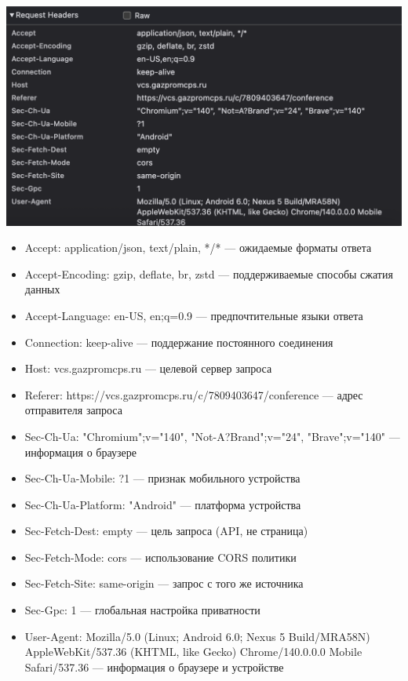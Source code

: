\documentclass{article}
\begin{document}
\begin{center}
  \includegraphics[width=.9\textwidth]{11}
\end{center}

\begin{itemize}
  \item Accept: application/json, text/plain, */* --- ожидаемые форматы ответа
  \item Accept-Encoding: gzip, deflate, br, zstd --- поддерживаемые способы сжатия данных
  \item Accept-Language: en-US, en;q=0.9 --- предпочтительные языки ответа
  \item Connection: keep-alive --- поддержание постоянного соединения
  \item Host: vcs.gazpromcps.ru --- целевой сервер запроса
  \item Referer: https://vcs.gazpromcps.ru/c/7809403647/conference --- адрес отправителя запроса
  \item Sec-Ch-Ua: "Chromium";v="140", "Not-A?Brand";v="24", "Brave";v="140" --- информация о браузере
  \item Sec-Ch-Ua-Mobile: ?1 --- признак мобильного устройства
  \item Sec-Ch-Ua-Platform: "Android" --- платформа устройства
  \item Sec-Fetch-Dest: empty --- цель запроса (API, не страница)
  \item Sec-Fetch-Mode: cors --- использование CORS политики
  \item Sec-Fetch-Site: same-origin --- запрос с того же источника
  \item Sec-Gpc: 1 --- глобальная настройка приватности
  \item User-Agent: Mozilla/5.0 (Linux; Android 6.0; Nexus 5 Build/MRA58N) AppleWebKit/537.36 (KHTML, like Gecko) Chrome/140.0.0.0 Mobile Safari/537.36 --- информация о браузере и устройстве
\end{itemize}
\end{document}
